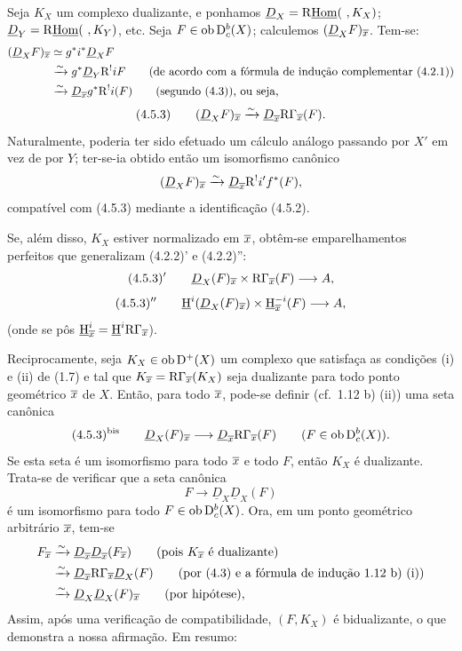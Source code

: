 Seja $K_X$ um complexo dualizante, e ponhamos $\underline{D}_X=\mathrm{R}\underline{\operatorname{Hom}}(\ ,K_X)$; $\underline{D}_Y=\R\underline{\Hom}(\ ,K_Y)$, etc. Seja $F\in\operatorname{ob}\mathrm{D}_c^b(X)$; calculemos $(\underline{D}_XF)_{\overline{x}}$. Tem-se:
\[
\begin{aligned}
(\underline{D}_XF)_{\overline{x}}&\simeq g^*i^*\underline{D}_X F\\
&\xrightarrow{\sim}g^*\underline{D}_Y\mathrm{R}^{!}iF\qquad\text{(de acordo com a fórmula de indução complementar (4.2.1))}\\
&\xrightarrow{\sim}\underline{D}_{\overline{x}}g^*\mathrm{R}^{!}i(F)\qquad\text{(segundo (4.3)), ou seja,}
\end{aligned}
\]
\[
(4.5.3)\qquad (\underline{D}_X F)_{\overline{x}}\xrightarrow{\sim}\underline{D}_{\overline{x}}\mathrm{R}\Gamma_{\overline{x}}(F).
\]
Naturalmente, poderia ter sido efetuado um cálculo análogo passando por $X'$ em vez de por $Y$; ter-se-ia obtido então um isomorfismo canônico
\[
(\underline{D}_XF)_{\overline{x}}\xrightarrow{\sim}\underline{D}_{\overline{x}}\mathrm{R}^{!}i'f^*(F),
\]
compatível com (4.5.3) mediante a identificação (4.5.2).

Se, além disso, $K_X$ estiver normalizado em $\overline{x}$, obtêm-se emparelhamentos perfeitos que generalizam (4.2.2)' e (4.2.2)'':
\[
(4.5.3)'\qquad \underline{D}_X(F)_{\overline{x}}\times \mathrm{R}\Gamma_{\overline{x}}(F)\longrightarrow A,
\]
\[
(4.5.3)''\qquad \underline{\mathrm H}^i(\underline{D}_X(F)_{\overline{x}})\times \underline{\mathrm H}_{\overline{x}}^{-i}(F)\longrightarrow A,
\]
(onde se pôs $\underline{\mathrm H}_{\overline{x}}^i=\underline{\mathrm H}^i\mathrm{R}\Gamma_{\overline{x}}$).

Reciprocamente, seja $K_X\in\operatorname{ob}\mathrm{D}^+(X)$ um complexo que satisfaça as condições (i) e (ii) de (1.7) e tal que $K_{\overline{x}}=\mathrm{R}\Gamma_{\overline{x}}(K_X)$ seja dualizante para todo ponto geométrico $\overline{x}$ de $X$. Então, para todo $\overline{x}$, pode-se definir (cf.~1.12 b) (ii)) uma seta canônica
\[
(4.5.3)^{\mathrm{bis}}\qquad \underline{D}_X(F)_{\overline{x}}\longrightarrow \underline{D}_{\overline{x}}\mathrm{R}\Gamma_{\overline{x}}(F)\qquad (F\in\operatorname{ob}\mathrm{D}_c^b(X)).
\]
Se esta seta é um isomorfismo para todo $\overline{x}$ e todo $F$, então $K_X$ é dualizante. Trata-se de verificar que a seta canônica
\[
F\longrightarrow \underline{D}_X\underline{D}_X(F)
\]
é um isomorfismo para todo $F\in\operatorname{ob}\mathrm{D}_c^b(X)$. Ora, em um ponto geométrico arbitrário $\overline{x}$, tem-se
\[
\begin{aligned}
F_{\overline{x}}&\xrightarrow{\sim}\underline{D}_{\overline{x}}\underline{D}_{\overline{x}}(F_{\overline{x}})\qquad\text{(pois $K_{\overline{x}}$ é dualizante)}\\
&\xrightarrow{\sim}\underline{D}_{\overline{x}}\mathrm{R}\Gamma_{\overline{x}}\underline{D}_X(F)\qquad\text{(por (4.3) e a fórmula de indução 1.12 b) (i))}\\
&\xrightarrow{\sim}\underline{D}_X\underline{D}_X(F)_{\overline{x}}\qquad\text{(por hipótese)},
\end{aligned}
\]
Assim, após uma verificação de compatibilidade, $(F,K_X)$ é bidualizante, o que demonstra a nossa afirmação. Em resumo:

